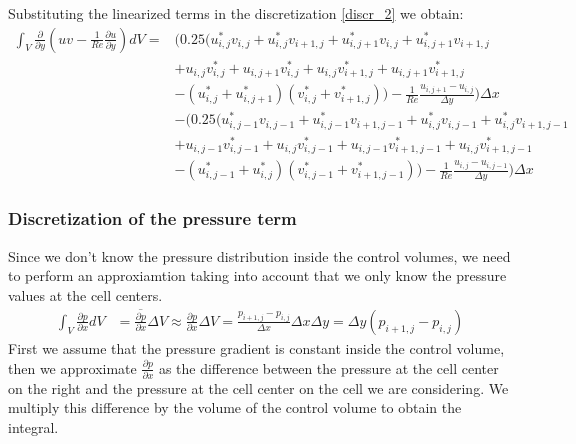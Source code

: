 \documentclass{article}
\begin{document}
Substituting the linearized terms in the discretization \eqref{discr_2} we obtain:
\begin{equation}
  \begin{aligned}
  \int_{V} \frac{\partial}{\partial y} (uv - \frac{1}{Re} \frac{\partial u}{\partial y}) dV = & (0.25 (u^*_{i,j}v_{i,j} + u^*_{i,j}v_{i+1,j} + u^*_{i,j+1}v_{i,j} + u^*_{i,j+1}v_{i+1,j} \\
  & + u_{i,j}v^*_{i,j} + u_{i,j+1}v^*_{i,j} + u_{i,j}v^*_{i+1,j} + u_{i,j+1}v^*_{i+1,j} \\
  & - (u^*_{i,j} + u^*_{i,j+1}) (v^*_{i,j} + v^*_{i+1,j})) - \frac{1}{Re} \frac{u_{i,j+1} - u_{i,j}}{\Delta y}) \Delta x \\
  & - (0.25 (u^*_{i,j-1}v_{i,j-1} + u^*_{i,j-1}v_{i+1,j-1} + u^*_{i,j}v_{i,j-1} + u^*_{i,j}v_{i+1,j-1} \\
  & + u_{i,j-1}v^*_{i,j-1} + u_{i,j}v^*_{i,j-1} + u_{i,j-1}v^*_{i+1,j-1} + u_{i,j}v^*_{i+1,j-1} \\
  & - (u^*_{i,j-1} + u^*_{i,j}) (v^*_{i,j-1} + v^*_{i+1,j-1})) - \frac{1}{Re} \frac{u_{i,j} - u_{i,j-1}}{\Delta y}) \Delta x
  \end{aligned}
\end{equation}


\subsubsection*{Discretization of the pressure term}
Since we don't know the pressure distribution inside the control volumes, we need to perform an approxiamtion taking into account that we only know the pressure values at the cell centers.
\begin{equation}
\begin{aligned}
  \int_{V} \frac{\partial p}{\partial x} dV &= \overline{\frac{\partial p}{\partial x}} \Delta V 
  \approx \frac{\partial p}{\partial x} \Delta V 
  = \frac{p_{i+1,j} - p_{i,j}}{\Delta x} \Delta x \Delta y 
  = \Delta y (p_{i+1,j} - p_{i,j})
\end{aligned}
\end{equation}
First we assume that the pressure gradient is constant inside the control volume, then we approximate $\frac{\partial p}{\partial x}$ as the difference between the pressure at the cell center on the right and the pressure at the cell center on the cell we are considering. We multiply this difference by the volume of the control volume to obtain the integral.
\end{document}
